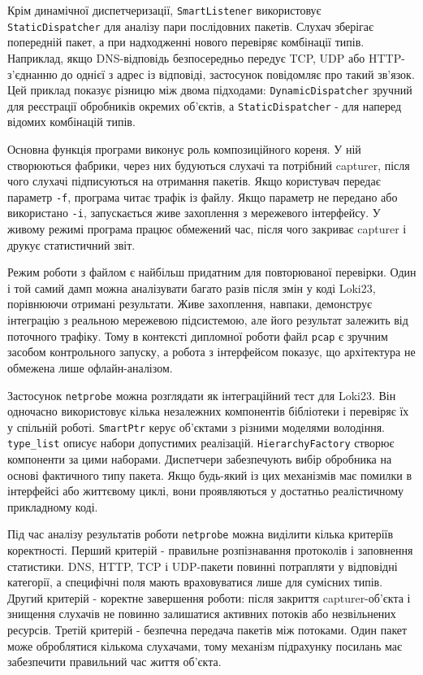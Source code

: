 Крім динамічної диспетчеризації, \texttt{SmartListener} використовує
\texttt{StaticDispatcher} для аналізу пари послідовних пакетів. Слухач
зберігає попередній пакет, а при надходженні нового перевіряє комбінації
типів. Наприклад, якщо DNS-відповідь безпосередньо передує TCP, UDP або
HTTP-з'єднанню до однієї з адрес із відповіді, застосунок повідомляє про
такий зв'язок. Цей приклад показує різницю між двома підходами:
\texttt{DynamicDispatcher} зручний для реєстрації обробників окремих
об'єктів, а \texttt{StaticDispatcher} - для наперед відомих комбінацій
типів.

Основна функція програми виконує роль композиційного кореня. У ній
створюються фабрики, через них будуються слухачі та потрібний capturer,
після чого слухачі підписуються на отримання пакетів. Якщо користувач
передає параметр \texttt{-f}, програма читає трафік із файлу. Якщо
параметр не передано або використано \texttt{-i}, запускається живе
захоплення з мережевого інтерфейсу. У живому режимі програма працює
обмежений час, після чого закриває capturer і друкує статистичний звіт.

Режим роботи з файлом є найбільш придатним для повторюваної перевірки.
Один і той самий дамп можна аналізувати багато разів після змін у коді
Loki23, порівнюючи отримані результати. Живе захоплення, навпаки,
демонструє інтеграцію з реальною мережевою підсистемою, але його
результат залежить від поточного трафіку. Тому в контексті дипломної
роботи файл \texttt{pcap} є зручним засобом контрольного запуску, а
робота з інтерфейсом показує, що архітектура не обмежена лише
офлайн-аналізом.

Застосунок \texttt{netprobe} можна розглядати як інтеграційний тест для
Loki23. Він одночасно використовує кілька незалежних компонентів
бібліотеки і перевіряє їх у спільній роботі. \texttt{SmartPtr} керує
об'єктами з різними моделями володіння. \texttt{type\_list} описує
набори допустимих реалізацій. \texttt{HierarchyFactory} створює
компоненти за цими наборами. Диспетчери забезпечують вибір обробника на
основі фактичного типу пакета. Якщо будь-який із цих механізмів має
помилки в інтерфейсі або життєвому циклі, вони проявляються у достатньо
реалістичному прикладному коді.

Під час аналізу результатів роботи \texttt{netprobe} можна виділити
кілька критеріїв коректності. Перший критерій - правильне розпізнавання
протоколів і заповнення статистики. DNS, HTTP, TCP і UDP-пакети повинні
потрапляти у відповідні категорії, а специфічні поля мають враховуватися
лише для сумісних типів. Другий критерій - коректне завершення роботи:
після закриття capturer-об'єкта і знищення слухачів не повинно
залишатися активних потоків або незвільнених ресурсів. Третій критерій -
безпечна передача пакетів між потоками. Один пакет може оброблятися
кількома слухачами, тому механізм підрахунку посилань має забезпечити
правильний час життя об'єкта.

